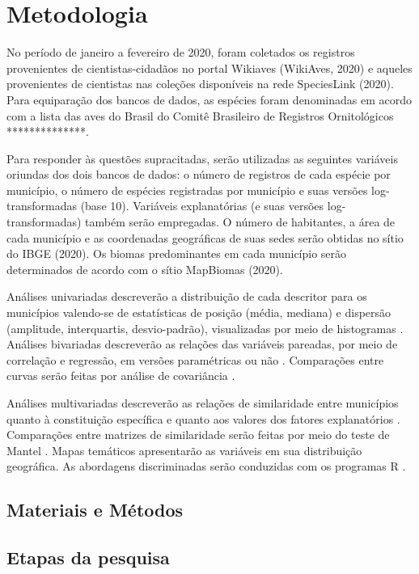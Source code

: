 \section{Metodologia}

No período de janeiro a fevereiro de 2020, foram coletados os registros provenientes de cientistas-cidadãos no portal Wikiaves (WikiAves, 2020) e aqueles provenientes de cientistas nas coleções disponíveis na rede SpeciesLink (2020). Para equiparação dos bancos de dados, as espécies foram denominadas em acordo com a lista das aves do Brasil do Comitê Brasileiro de Registros Ornitológicos \cite{De2015}**************.

Para responder às questões supracitadas, serão utilizadas as seguintes variáveis oriundas dos dois bancos de dados: o número de registros de cada espécie por município, o número de espécies registradas por município e suas versões log-transformadas (base 10). Variáveis explanatórias (e suas versões log-transformadas) também serão empregadas. O número de habitantes, a área de cada município e as coordenadas geográficas de suas sedes serão obtidas no sítio do IBGE (2020). Os biomas predominantes em cada município serão determinados de acordo com o sítio MapBiomas (2020).

Análises univariadas descreverão a distribuição de cada descritor para os municípios valendo-se de estatísticas de posição (média, mediana) e dispersão (amplitude, interquartis, desvio-padrão), visualizadas por meio de histogramas \cite{NicholasJ.Gotelli;AaronM.Ellison2010,Borcard2011}. Análises bivariadas descreverão as relações das variáveis pareadas, por meio de correlação e regressão, em versões paramétricas ou não \cite{NicholasJ.Gotelli;AaronM.Ellison2010,Borcard2011}. Comparações entre curvas serão feitas por análise de covariância \cite{NicholasJ.Gotelli;AaronM.Ellison2010,Borcard2011}.

Análises multivariadas descreverão as relações de similaridade entre municípios quanto à constituição específica e quanto aos valores dos fatores explanatórios \cite{NicholasJ.Gotelli;AaronM.Ellison2010,Borcard2011}. Comparações entre matrizes de similaridade serão feitas por meio do teste de Mantel \cite{Borcard2011}. Mapas temáticos apresentarão as variáveis em sua distribuição geográfica. As abordagens discriminadas serão conduzidas com os programas R \cite{CoreTeam2017}.


\subsection{Materiais e Métodos}

\subsection{Etapas da pesquisa}
